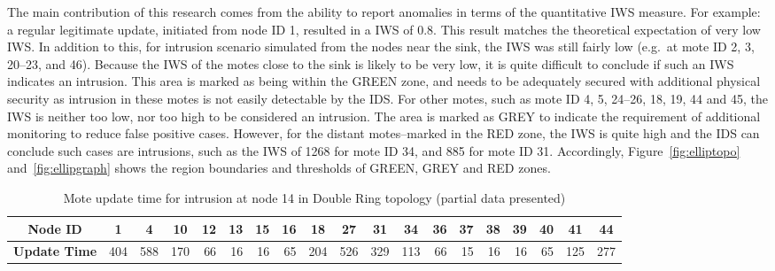 \documentclass{CRPITStyle}
\newcommand*{\bd}[1]{\multicolumn{1}{|c|}{\bfseries #1}}
\begin{document}
The main contribution of this research comes from the ability to report anomalies in terms of the quantitative IWS measure.
For example:  a regular legitimate update, initiated from node ID 1, resulted in a IWS of 0.8.
This result matches the theoretical expectation of very low IWS.
In addition to this, for intrusion scenario simulated from the nodes near the sink, the IWS was still fairly low (e.g.\ at mote ID 2, 3, 20--23, and 46). 
Because the IWS of the motes close to the sink is likely to be very low, it is quite difficult to conclude if such an IWS indicates an intrusion.
This area is marked as being within the GREEN zone, and needs to be adequately secured with additional physical security as intrusion in these motes is not easily detectable by the IDS.
For other motes, such as mote ID 4, 5, 24--26, 18, 19, 44 and 45, the IWS is neither too low, nor too high to be considered an intrusion. The area is marked as GREY to indicate the requirement of additional monitoring to reduce false positive cases.
However, for the distant motes--marked in the RED zone, the IWS is quite high and the IDS can conclude such cases are intrusions, such as the IWS of 1268 for mote ID 34, and 885 for mote ID 31. %
Accordingly, Figure~\ref{fig:elliptopo} and~\ref{fig:ellipgraph} shows the region boundaries and thresholds of GREEN, GREY and RED zones.%

\begin{table}[t]
\centering
\begin{tabular}{|l|*{17}{r|}r|}
\hline
\bd{Node ID}           & \bd{1} & \bd{4} & \bd{10} & \bd{12} & \bd{13} & \bd{15} & \bd{16} & \bd{18} & \bd{27} & \bd{31} & \bd{34} & \bd{36} & \bd{37} & \bd{38} & \bd{39} & \bd{40} & \bd{41} & \bd{44}\\
\hline
\bd{Update Time}  &   404 	&  588 	& 170 	& 66 	& 16 &	 16 	& 65 &	 204 &	 526 & 329 &	 113 &	 66 &	 15 	& 16 	& 16 &	 65 &	125 & 277 \\
\hline
\end{tabular}
\caption{Mote update time for intrusion at node 14 in Double Ring topology (partial data presented)}

\label{tab:dr_time_14}
\end{table}
\end{document}
